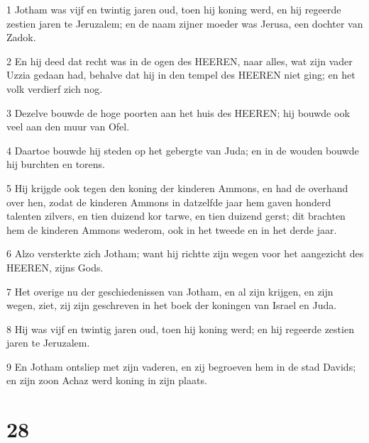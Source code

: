 \par 1 Jotham was vijf en twintig jaren oud, toen hij koning werd, en hij regeerde zestien jaren te Jeruzalem; en de naam zijner moeder was Jerusa, een dochter van Zadok.
\par 2 En hij deed dat recht was in de ogen des HEEREN, naar alles, wat zijn vader Uzzia gedaan had, behalve dat hij in den tempel des HEEREN niet ging; en het volk verdierf zich nog.
\par 3 Dezelve bouwde de hoge poorten aan het huis des HEEREN; hij bouwde ook veel aan den muur van Ofel.
\par 4 Daartoe bouwde hij steden op het gebergte van Juda; en in de wouden bouwde hij burchten en torens.
\par 5 Hij krijgde ook tegen den koning der kinderen Ammons, en had de overhand over hen, zodat de kinderen Ammons in datzelfde jaar hem gaven honderd talenten zilvers, en tien duizend kor tarwe, en tien duizend gerst; dit brachten hem de kinderen Ammons wederom, ook in het tweede en in het derde jaar.
\par 6 Alzo versterkte zich Jotham; want hij richtte zijn wegen voor het aangezicht des HEEREN, zijns Gods.
\par 7 Het overige nu der geschiedenissen van Jotham, en al zijn krijgen, en zijn wegen, ziet, zij zijn geschreven in het boek der koningen van Israel en Juda.
\par 8 Hij was vijf en twintig jaren oud, toen hij koning werd; en hij regeerde zestien jaren te Jeruzalem.
\par 9 En Jotham ontsliep met zijn vaderen, en zij begroeven hem in de stad Davids; en zijn zoon Achaz werd koning in zijn plaats.

\chapter{28}

